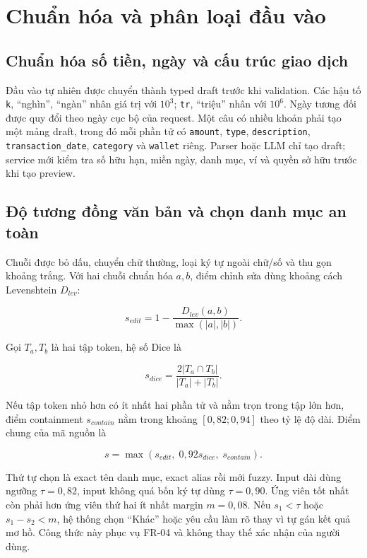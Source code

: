 \section{Chuẩn hóa và phân loại đầu vào}

\subsection{Chuẩn hóa số tiền, ngày và cấu trúc giao dịch}

Đầu vào tự nhiên được chuyển thành typed draft trước khi validation.
Các hậu tố \texttt{k}, ``nghìn'', ``ngàn'' nhân giá trị với $10^3$;
\texttt{tr}, ``triệu'' nhân với $10^6$. Ngày tương đối được quy đổi theo
ngày cục bộ của request. Một câu có nhiều khoản phải tạo một mảng draft,
trong đó mỗi phần tử có \texttt{amount}, \texttt{type},
\texttt{description}, \texttt{transaction\_date}, \texttt{category}
và \texttt{wallet} riêng. Parser hoặc LLM chỉ tạo draft; service mới
kiểm tra số hữu hạn, miền ngày, danh mục, ví và quyền sở hữu trước khi
tạo preview.

\subsection{Độ tương đồng văn bản và chọn danh mục an toàn}

Chuỗi được bỏ dấu, chuyển chữ thường, loại ký tự ngoài chữ/số và thu gọn
khoảng trắng. Với hai chuỗi chuẩn hóa $a,b$, điểm chỉnh sửa dùng khoảng
cách Levenshtein $D_{lev}$:

\begin{equation}
  s_{edit}=1-\frac{D_{lev}(a,b)}{\max(|a|,|b|)}.
\end{equation}

Gọi $T_a,T_b$ là hai tập token, hệ số Dice là

\begin{equation}
  s_{dice}=\frac{2|T_a\cap T_b|}{|T_a|+|T_b|}.
\end{equation}

Nếu tập token nhỏ hơn có ít nhất hai phần tử và nằm trọn trong tập lớn
hơn, điểm containment $s_{contain}$ nằm trong khoảng
$[0{,}82;0{,}94]$ theo tỷ lệ độ dài. Điểm chung của mã nguồn là

\begin{equation}
  s=\max(s_{edit},\;0{,}92s_{dice},\;s_{contain}).
\end{equation}

Thứ tự chọn là exact tên danh mục, exact alias rồi mới fuzzy. Input dài
dùng ngưỡng $\tau=0{,}82$, input không quá bốn ký tự dùng
$\tau=0{,}90$. Ứng viên tốt nhất còn phải hơn ứng viên thứ hai ít nhất
margin $m=0{,}08$. Nếu $s_1<\tau$ hoặc $s_1-s_2<m$, hệ thống chọn
``Khác'' hoặc yêu cầu làm rõ thay vì tự gán kết quả mơ hồ. Công thức này
phục vụ FR-04 và không thay thế xác nhận của người dùng.

